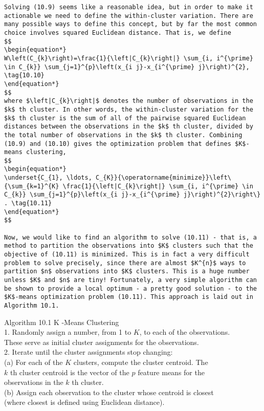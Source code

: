 \documentclass[10pt]{article}
\begin{document}
\begin{verbatim}
Solving (10.9) seems like a reasonable idea, but in order to make it actionable we need to define the within-cluster variation. There are many possible ways to define this concept, but by far the most common choice involves squared Euclidean distance. That is, we define
$$
\begin{equation*}
W\left(C_{k}\right)=\frac{1}{\left|C_{k}\right|} \sum_{i, i^{\prime} \in C_{k}} \sum_{j=1}^{p}\left(x_{i j}-x_{i^{\prime} j}\right)^{2}, \tag{10.10}
\end{equation*}
$$
where $\left|C_{k}\right|$ denotes the number of observations in the $k$ th cluster. In other words, the within-cluster variation for the $k$ th cluster is the sum of all of the pairwise squared Euclidean distances between the observations in the $k$ th cluster, divided by the total number of observations in the $k$ th cluster. Combining (10.9) and (10.10) gives the optimization problem that defines $K$-means clustering,
$$
\begin{equation*}
\underset{C_{1}, \ldots, C_{K}}{\operatorname{minimize}}\left\{\sum_{k=1}^{K} \frac{1}{\left|C_{k}\right|} \sum_{i, i^{\prime} \in C_{k}} \sum_{j=1}^{p}\left(x_{i j}-x_{i^{\prime} j}\right)^{2}\right\} . \tag{10.11}
\end{equation*}
$$

Now, we would like to find an algorithm to solve (10.11) - that is, a method to partition the observations into $K$ clusters such that the objective of (10.11) is minimized. This is in fact a very difficult problem to solve precisely, since there are almost $K^{n}$ ways to partition $n$ observations into $K$ clusters. This is a huge number unless $K$ and $n$ are tiny! Fortunately, a very simple algorithm can be shown to provide a local optimum - a pretty good solution - to the $K$-means optimization problem (10.11). This approach is laid out in Algorithm 10.1.
\end{verbatim}

Algorithm 10.1 K -Means Clustering\\
1. Randomly assign a number, from 1 to $K$, to each of the observations.\\
These serve as initial cluster assignments for the observations.\\
2. Iterate until the cluster assignments stop changing:\\
(a) For each of the $K$ clusters, compute the cluster centroid. The\\
$k$ th cluster centroid is the vector of the $p$ feature means for the\\
observations in the $k$ th cluster.\\
(b) Assign each observation to the cluster whose centroid is closest\\
(where closest is defined using Euclidean distance).
\end{document}
